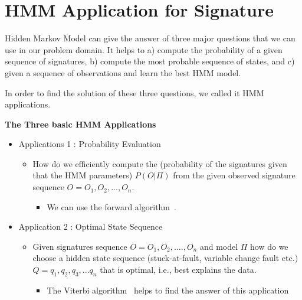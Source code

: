 \section{HMM Application for Signature}

Hidden Markov Model can give the answer of three major questions that we can use in our problem domain. It helps to a) compute the probability of a given sequence of signatures, b) compute the most probable sequence of states, and c) given a sequence of observations and learn the best HMM model.

In order to find the solution of these three questions, we called it HMM applications.


\textbf{The Three basic HMM Applications}

\begin{itemize}
\item Applications 1 : Probability Evaluation
 \begin{itemize}
 \item How do we efficiently compute the (probability of the signatures given that the HMM parameters) $P(O|\Pi)$ from the given observed signature sequence $O = {O_1, O_2,...,O_n}$.
 
  \begin{itemize}
  \item We can use the forward algorithm~\cite{ghahramani1996factorial}.
  \end{itemize}
 \end{itemize}
\end{itemize}

\begin{itemize}
\item Application 2 : Optimal State Sequence
 \begin{itemize}
 \item Given signatures sequence $O = {O_1, O_2,....,}O_n$ and model $\Pi$ how do we choose a hidden state sequence (stuck-at-fault, variable change fault etc.) $Q={q_1,q_2,q_3,...q_n}$
that is optimal, i.e., best explains the data. 
  \begin{itemize}
  \item The Viterbi algorithm~\cite{forney1973viterbi} helps to find the answer of this application
  \end{itemize}
 \end{itemize}
\end{itemize}



